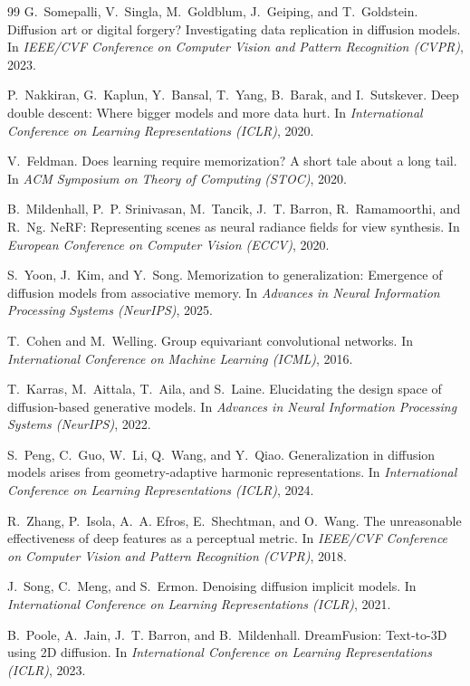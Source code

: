 \documentclass[11pt]{article}
\begin{document}
\begin{thebibliography}{99}
G.~Somepalli, V.~Singla, M.~Goldblum, J.~Geiping, and T.~Goldstein.
Diffusion art or digital forgery? Investigating data replication in diffusion
models.
In \textit{IEEE/CVF Conference on Computer Vision and Pattern Recognition (CVPR)}, 2023.

P.~Nakkiran, G.~Kaplun, Y.~Bansal, T.~Yang, B.~Barak, and I.~Sutskever.
Deep double descent: Where bigger models and more data hurt.
In \textit{International Conference on Learning Representations (ICLR)}, 2020.

V.~Feldman.
Does learning require memorization? A short tale about a long tail.
In \textit{ACM Symposium on Theory of Computing (STOC)}, 2020.

B.~Mildenhall, P.~P. Srinivasan, M.~Tancik, J.~T. Barron, R.~Ramamoorthi,
and R.~Ng.
NeRF: Representing scenes as neural radiance fields for view synthesis.
In \textit{European Conference on Computer Vision (ECCV)}, 2020.

S.~Yoon, J.~Kim, and Y.~Song.
Memorization to generalization: Emergence of diffusion models from associative
memory.
In \textit{Advances in Neural Information Processing Systems (NeurIPS)}, 2025.

T.~Cohen and M.~Welling.
Group equivariant convolutional networks.
In \textit{International Conference on Machine Learning (ICML)}, 2016.

T.~Karras, M.~Aittala, T.~Aila, and S.~Laine.
Elucidating the design space of diffusion-based generative models.
In \textit{Advances in Neural Information Processing Systems (NeurIPS)}, 2022.

S.~Peng, C.~Guo, W.~Li, Q.~Wang, and Y.~Qiao.
Generalization in diffusion models arises from geometry-adaptive harmonic
representations.
In \textit{International Conference on Learning Representations (ICLR)}, 2024.

R.~Zhang, P.~Isola, A.~A. Efros, E.~Shechtman, and O.~Wang.
The unreasonable effectiveness of deep features as a perceptual metric.
In \textit{IEEE/CVF Conference on Computer Vision and Pattern Recognition (CVPR)}, 2018.

J.~Song, C.~Meng, and S.~Ermon.
Denoising diffusion implicit models.
In \textit{International Conference on Learning Representations (ICLR)}, 2021.

B.~Poole, A.~Jain, J.~T. Barron, and B.~Mildenhall.
DreamFusion: Text-to-3D using 2D diffusion.
In \textit{International Conference on Learning Representations (ICLR)}, 2023.

\end{thebibliography}
\end{document}
